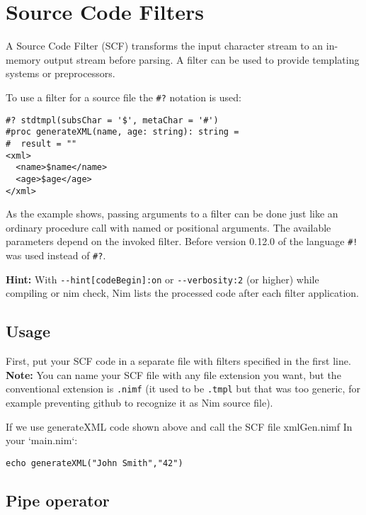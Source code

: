 \hypertarget{source-code-filters}{%
\section{Source Code Filters}\label{source-code-filters}}

A {Source Code Filter (SCF)} transforms the input character stream to an
in-memory output stream before parsing. A filter can be used to provide
templating systems or preprocessors.

To use a filter for a source file the \texttt{\#?} notation is used:

\begin{verbatim}
#? stdtmpl(subsChar = '$', metaChar = '#')
#proc generateXML(name, age: string): string =
#  result = ""
<xml>
  <name>$name</name>
  <age>$age</age>
</xml>
\end{verbatim}

As the example shows, passing arguments to a filter can be done just
like an ordinary procedure call with named or positional arguments. The
available parameters depend on the invoked filter. Before version 0.12.0
of the language \texttt{\#!} was used instead of \texttt{\#?}.

\textbf{Hint:} With \texttt{-\/-hint{[}codeBegin{]}:on} or
\texttt{-\/-verbosity:2} (or higher) while compiling or {nim check}, Nim
lists the processed code after each filter application.

\hypertarget{usage}{%
\subsection{Usage}\label{usage}}

First, put your SCF code in a separate file with filters specified in
the first line. \textbf{Note:} You can name your SCF file with any file
extension you want, but the conventional extension is \texttt{.nimf} (it
used to be \texttt{.tmpl} but that was too generic, for example
preventing github to recognize it as Nim source file).

If we use {generateXML} code shown above and call the SCF file
{xmlGen.nimf} In your `main.nim`:

\begin{verbatim}
echo generateXML("John Smith","42")
\end{verbatim}

\hypertarget{pipe-operator}{%
\subsection{Pipe operator}\label{pipe-operator}}

